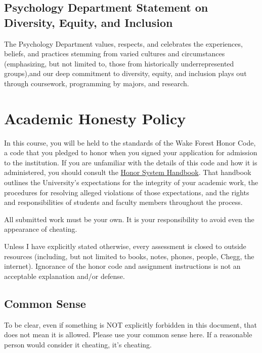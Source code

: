 \hypertarget{psychology-department-statement-on-diversity-equity-and-inclusion}{%
\section{Psychology Department Statement on Diversity, Equity, and Inclusion}\label{psychology-department-statement-on-diversity-equity-and-inclusion}}

The Psychology Department values, respects, and celebrates the experiences, beliefs, and practices stemming from varied cultures and circumstances (emphasizing, but not limited to, those from historically underrepresented groups),and our deep commitment to diversity, equity, and inclusion plays out through coursework, programming by majors, and research.

\hypertarget{academic-honesty-policy}{%
\chapter{Academic Honesty Policy}\label{academic-honesty-policy}}

In this course, you will be held to the standards of the Wake Forest Honor Code, a code that you pledged to honor when you signed your application for admission to the institution.
If you are unfamiliar with the details of this code and how it is administered, you should consult the \href{https://studentconduct.wfu.edu/honor-system-wfu/}{Honor System Handbook}.
That handbook outlines the University's expectations for the integrity of your academic work, the procedures for resolving alleged violations of those expectations, and the rights and responsibilities of students and faculty members throughout the process.

All submitted work must be your own. It is your responsibility to avoid even the appearance of cheating.

Unless I have explicitly stated otherwise, every assessment is closed to outside resources (including, but not limited to books, notes, phones, people, Chegg, the internet).
Ignorance of the honor code and assignment instructions is not an acceptable explanation and/or defense.

\hypertarget{common-sense}{%
\section{Common Sense}\label{common-sense}}

To be clear, even if something is NOT explicitly forbidden in this document, that does not mean it is allowed. Please use your common sense here. If a reasonable person would consider it cheating, it's cheating.

